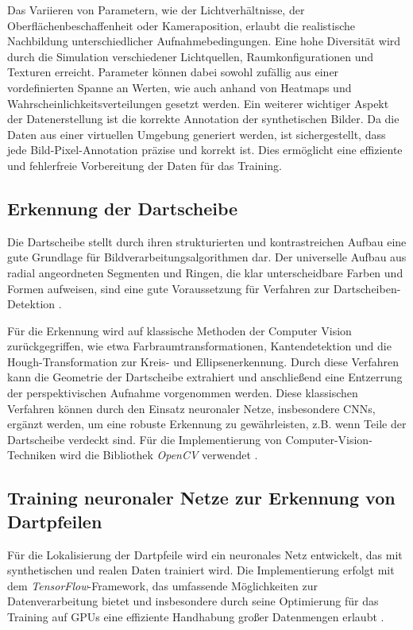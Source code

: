 Das Variieren von Parametern, wie der Lichtverhältnisse, der Oberflächenbeschaffenheit oder Kameraposition, erlaubt die realistische Nachbildung unterschiedlicher Aufnahmebedingungen. Eine hohe Diversität wird durch die Simulation verschiedener Lichtquellen, Raumkonfigurationen und Texturen erreicht. Parameter können dabei sowohl zufällig aus einer vordefinierten Spanne an Werten, wie auch anhand von Heatmaps und Wahrscheinlichkeitsverteilungen gesetzt werden. Ein weiterer wichtiger Aspekt der Datenerstellung ist die korrekte Annotation der synthetischen Bilder. Da die Daten aus einer virtuellen Umgebung generiert werden, ist sichergestellt, dass jede Bild-Pixel-Annotation präzise und korrekt ist. Dies ermöglicht eine effiziente und fehlerfreie Vorbereitung der Daten für das Training.

\subsection{Erkennung der Dartscheibe}
\label{sec:implementierung:dartscheibe}

Die Dartscheibe stellt durch ihren strukturierten und kontrastreichen Aufbau eine gute Grundlage für Bildverarbeitungsalgorithmen dar. Der universelle Aufbau aus radial angeordneten Segmenten und Ringen, die klar unterscheidbare Farben und Formen aufweisen, sind eine gute Voraussetzung für Verfahren zur Dartscheiben-Detektion \cite{dra-darts-rules, wdf-darts-rules}.

Für die Erkennung wird auf klassische Methoden der Computer Vision zurückgegriffen, wie etwa Farbraumtransformationen, Kantendetektion und die Hough-Transformation zur Kreis- und Ellipsenerkennung. Durch diese Verfahren kann die Geometrie der Dartscheibe extrahiert und anschließend eine Entzerrung der perspektivischen Aufnahme vorgenommen werden. Diese klassischen Verfahren können durch den Einsatz neuronaler Netze, insbesondere CNNs, ergänzt werden, um eine robuste Erkennung zu gewährleisten, z.B. wenn Teile der Dartscheibe verdeckt sind. Für die Implementierung von Computer-Vision-Techniken wird die Bibliothek \textit{OpenCV} verwendet \cite{opencv}.

\subsection{Training neuronaler Netze zur Erkennung von Dartpfeilen}
\label{sec:implementierung:ki}

Für die Lokalisierung der Dartpfeile wird ein neuronales Netz entwickelt, das mit synthetischen und realen Daten trainiert wird. Die Implementierung erfolgt mit dem \textit{TensorFlow}-Framework, das umfassende Möglichkeiten zur Datenverarbeitung bietet und insbesondere durch seine Optimierung für das Training auf GPUs eine effiziente Handhabung großer Datenmengen erlaubt \cite{tensorflow}.

